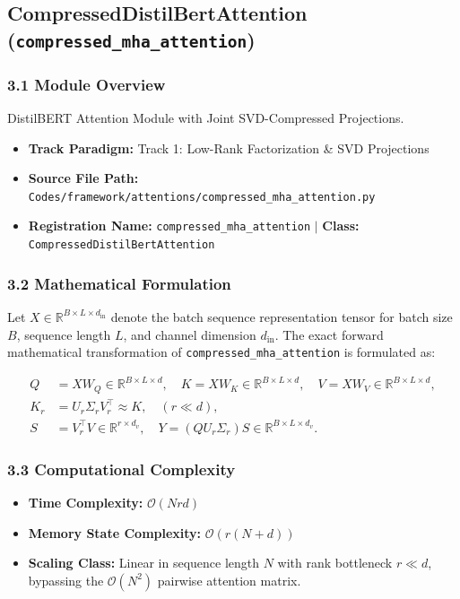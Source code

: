 \subsection{CompressedDistilBertAttention (\texttt{compressed\_mha\_attention})}
\label{sec:app_module_compressed_mha_attention}

\subsubsection*{3.1 Module Overview}
DistilBERT Attention Module with Joint SVD-Compressed Projections.
\begin{itemize}
    \item \textbf{Track Paradigm:} Track 1: Low-Rank Factorization \& SVD Projections
    \item \textbf{Source File Path:} \texttt{Codes/framework/attentions/compressed\_mha\_attention.py}
    \item \textbf{Registration Name:} \texttt{compressed\_mha\_attention} $\mid$ \textbf{Class:} \texttt{CompressedDistilBertAttention}
\end{itemize}

\subsubsection*{3.2 Mathematical Formulation}
Let $X \in \mathbb{R}^{B \times L \times d_{\text{in}}}$ denote the batch sequence representation tensor for batch size $B$, sequence length $L$, and channel dimension $d_{\text{in}}$. The exact forward mathematical transformation of \texttt{compressed\_mha\_attention} is formulated as:

\begin{align}
Q &= X W_Q \in \mathbb{R}^{B \times L \times d}, \quad K = X W_K \in \mathbb{R}^{B \times L \times d}, \quad V = X W_V \in \mathbb{R}^{B \times L \times d}, \\
K_r &= U_r \Sigma_r V_r^\top \approx K, \quad (r \ll d), \\
S &= V_r^\top V \in \mathbb{R}^{r \times d_v}, \quad Y = (Q U_r \Sigma_r) S \in \mathbb{R}^{B \times L \times d_v}.
\end{align}


\subsubsection*{3.3 Computational Complexity}
\begin{itemize}
    \item \textbf{Time Complexity:} $\mathcal{O}(N r d)$
    \item \textbf{Memory State Complexity:} $\mathcal{O}(r(N + d))$
    \item \textbf{Scaling Class:} Linear in sequence length $N$ with rank bottleneck $r \ll d$, bypassing the $\mathcal{O}(N^2)$ pairwise attention matrix.
\end{itemize}

